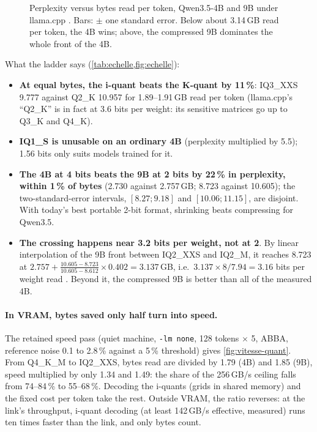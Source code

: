\begin{figure}[ht]
\centering
\GrapheEchelle
\caption[Perplexity versus bytes read per token, Qwen3.5 4B and 9B]{Perplexity versus bytes read per token, Qwen3.5-4B and 9B under llama.cpp \mes. Bars: $\pm$ one standard error. Below about 3.14\,GB read per token, the 4B wins; above, the compressed 9B dominates the whole front of the 4B.}
\label{fig:echelle}
\end{figure}

What the ladder says (\cref{tab:echelle,fig:echelle}):
\begin{itemize}
\item \textbf{At equal bytes, the i-quant beats the K-quant by 11\,\%}: IQ3\_XXS 9.777 against Q2\_K 10.957 for 1.89--1.91\,GB read per token (llama.cpp's \enquote{Q2\_K} is in fact at 3.6 bits per weight: its sensitive matrices go up to Q3\_K and Q4\_K).
\item \textbf{IQ1\_S is unusable on an ordinary 4B} (perplexity multiplied by 5.5); 1.56 bits only suits models trained for it.
\item \textbf{The 4B at 4 bits beats the 9B at 2 bits by 22\,\% in perplexity, within 1\,\% of bytes} (2.730 against 2.757\,GB; 8.723 against 10.605); the two-standard-error intervals, $[8.27 ; 9.18]$ and $[10.06 ; 11.15]$, are disjoint. With today's best portable 2-bit format, shrinking beats compressing for Qwen3.5.
\item \textbf{The crossing happens near 3.2 bits per weight, not at 2}. By linear interpolation of the 9B front between IQ2\_XXS and IQ2\_M, it reaches 8.723 at $2.757 + \frac{10.605 - 8.723}{10.605 - 8.612} \times 0.402 = 3.137$\,GB, i.e.\ $3.137 \times 8 / 7.94 = 3.16$ bits per weight read \calc. Beyond it, the compressed 9B is better than all of the measured 4B.
\end{itemize}

\paragraph{In VRAM, bytes saved only half turn into speed.} The retained speed pass (quiet machine, \texttt{-lm none}, 128 tokens $\times$ 5, ABBA, reference noise 0.1 to 2.8\,\% against a 5\,\% threshold) gives \cref{fig:vitesse-quant}. From Q4\_K\_M to IQ2\_XXS, bytes read are divided by 1.79 (4B) and 1.85 (9B), speed multiplied by only 1.34 and 1.49: the share of the 256\,GB/s ceiling falls from 74--84\,\% to 55--68\,\%. Decoding the i-quants (grids in shared memory) and the fixed cost per token take the rest. Outside VRAM, the ratio reverses: at the link's throughput, i-quant decoding (at least 142\,GB/s effective, measured) runs ten times faster than the link, and only bytes count.


